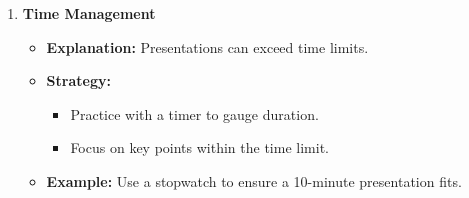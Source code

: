 \documentclass[aspectratio=169]{beamer}
\begin{document}
\begin{frame}[fragile]
\begin{enumerate}
        \item \textbf{Time Management}
            \begin{itemize}
                \item \textbf{Explanation:} Presentations can exceed time limits.
                \item \textbf{Strategy:}
                    \begin{itemize}
                        \item Practice with a timer to gauge duration.
                        \item Focus on key points within the time limit.
                    \end{itemize}
                \item \textbf{Example:} Use a stopwatch to ensure a 10-minute presentation fits.
            \end{itemize}
    \end{enumerate}
\end{frame}
\end{document}
